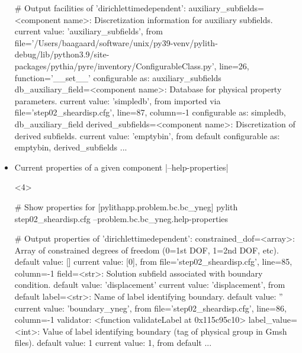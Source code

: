 \documentclass[aspectratio=169]{beamer}
\begin{document}
\begin{frame}[t,fragile]
\begin{itemize}
\begin{onlyenv}
\begin{bashcode}
        # Output
        facilities of 'dirichlettimedependent':
            auxiliary_subfields=<component name>: Discretization information for auxiliary subfields.
                current value: 'auxiliary_subfields', from {file='/Users/baagaard/software/unix/py39-venv/pylith-debug/lib/python3.9/site-packages/pythia/pyre/inventory/ConfigurableClass.py', line=26, function='__set__'}
                configurable as: auxiliary_subfields
            db_auxiliary_field=<component name>: Database for physical property parameters.
                current value: 'simpledb', from {imported} via {file='step02_sheardisp.cfg', line=87, column=-1}
                configurable as: simpledb, db_auxiliary_field
            derived_subfields=<component name>: Discretization of derived subfields.
                current value: 'emptybin', from {default}
                configurable as: emptybin, derived_subfields
            ...
      \end{bashcode}
    \end{onlyenv}
  \item Current properties of a given component \bashinline|--help-properties|
    \begin{onlyenv}<4>
      \begin{bashcode}
        # Show properties for [pylithapp.problem.bc.bc_yneg]
        pylith step02_sheardisp.cfg --problem.bc.bc_yneg.help-properties

        # Output
        properties of 'dirichlettimedependent':
            constrained_dof=<array>: Array of constrained degrees of freedom (0=1st DOF, 1=2nd DOF, etc).
                default value: []
                current value: [0], from {file='step02_sheardisp.cfg', line=85, column=-1}
            field=<str>: Solution subfield associated with boundary condition.
                default value: 'displacement'
                current value: 'displacement', from {default}
            label=<str>: Name of label identifying boundary.
                default value: ''
                current value: 'boundary_yneg', from {file='step02_sheardisp.cfg', line=86, column=-1}
                validator: <function validateLabel at 0x115c95c10>
            label_value=<int>: Value of label identifying boundary (tag of physical group in Gmsh files).
                default value: 1
                current value: 1, from {default}
            ...
      \end{bashcode}
    \end{onlyenv}
  \end{itemize}

\end{frame}
\end{document}
